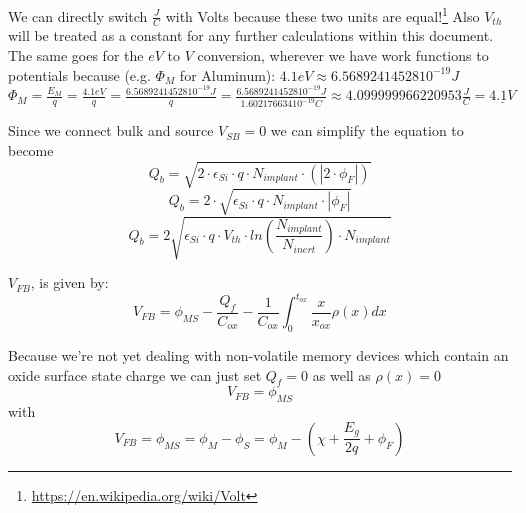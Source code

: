 \begin{mdframed}[linewidth=2pt,linecolor=red]
We can directly switch $\frac{J}{C}$ with Volts because these two units are equal!\footnote{\url{https://en.wikipedia.org/wiki/Volt}}
Also $V_{th}$ will be treated as a constant for any further calculations within this document.\\

The same goes for the $eV$ to $V$ conversion, wherever we have work functions to potentials because (e.g. $\Phi_M$ for Aluminum):
$4.1 eV \approx 6.56892414528 10^{-19}J$ \\
$\Phi_M=\frac{E_M}{q}=\frac{4.1 eV}{q}=\frac{6.56892414528 10^{-19} J}{q} = \frac{6.56892414528 10^{-19} J}{1.602176634 10^{-19} C} \approx 4.099999966220953 \frac{J}{C} = \underline{4.1V}$ \\
\end{mdframed}

Since we connect bulk and source $V_{SB}=0$ we can simplify the equation to become
\begin{equation}
Q_b
=
\sqrt{2\cdot\epsilon_{Si}\cdot q\cdot N_{implant} \cdot  ( \left| 2 \cdot \phi_F \right|) }
\end{equation}
\begin{equation}
Q_b
=
2\cdot\sqrt{\epsilon_{Si}\cdot q\cdot N_{implant}\cdot \left| \phi_F \right| }
\end{equation}
\begin{equation}
Q_b
=
2 \sqrt{\epsilon_{Si}\cdot q\cdot V_{th}\cdot ln\left(\frac{N_{implant}}{N_{inert}}\right) \cdot N_{implant} }
\end{equation}


$V_{FB}$, is given by:
\begin{equation}
V_{FB}
=
\phi_{MS}-\frac{Q_f}{C_{ox}}-\frac{1}{C_{ox}}\int_{0}^{t_{ox}}\frac{x}{x_{ox}}\rho(x) dx
\end{equation}

Because we're not yet dealing with non-volatile memory devices which contain an oxide surface state charge we can just set $Q_f=0$ as well as $\rho(x)=0$
\begin{equation}
V_{FB}
=
\phi_{MS}
\end{equation}
with
\begin{equation}
V_{FB}
=
\phi_{MS}
=
\phi_{M} - \phi_{S}
=
\phi_{M} -  \left(\chi + \frac{E_g}{2 q} + \phi_F \right)
\end{equation}

